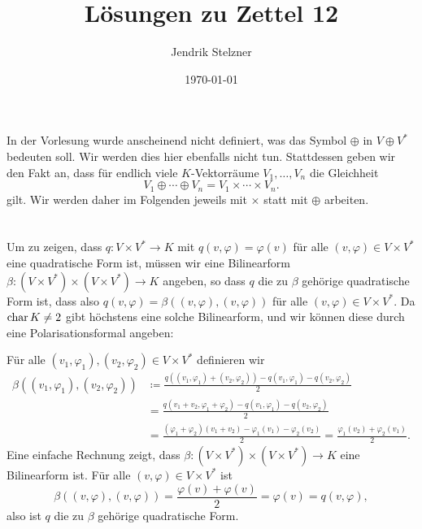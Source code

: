 \documentclass[a4paper,10pt,numbers=noenddot]{scrartcl}
\title{Lösungen zu Zettel 12}
\author{Jendrik Stelzner}
\date{\today}
\begin{document}
\maketitle










\begin{remark}
  In der Vorlesung wurde anscheinend nicht definiert, was das Symbol $\oplus$ in $V \oplus V^*$ bedeuten soll.
  Wir werden dies hier ebenfalls nicht tun.
  Stattdessen geben wir den Fakt an, dass für endlich viele $K$-Vektorräume $V_1, \dotsc, V_n$ die Gleichheit
  \[
      V_1 \oplus \dotsb \oplus V_n
    = V_1 \times \dotsb \times V_n.
  \]
  gilt.
  Wir werden daher im Folgenden jeweils mit $\times$ statt mit $\oplus$ arbeiten.
\end{remark}










\addtocounter{section}{2}










\section{}


Um zu zeigen, dass $q \colon V \times V^* \to K$ mit $q(v, \varphi) = \varphi(v)$ für alle $(v, \varphi) \in V \times V^*$ eine quadratische Form ist, müssen wir eine Bilinearform $\beta \colon (V \times V^*) \times (V \times V^*) \to K$ angeben, so dass $q$ die zu $\beta$ gehörige quadratische Form ist, dass also $q(v,\varphi) = \beta((v, \varphi), (v, \varphi))$ für alle $(v,\varphi) \in V \times V^*$.
Da $\operatorname{char} K \neq 2$ gibt höchstens eine solche Bilinearform, und wir können diese durch eine Polarisationsformal angeben:

Für alle $(v_1, \varphi_1), (v_2, \varphi_2) \in V \times V^*$ definieren wir
\begin{align*}
              \beta((v_1, \varphi_1), (v_2, \varphi_2))
  &\coloneqq  \frac{q((v_1, \varphi_1) + (v_2, \varphi_2)) - q(v_1, \varphi_1) - q(v_2, \varphi_2)}{2}  \\
  &=          \frac{q(v_1 + v_2, \varphi_1 + \varphi_2) - q(v_1, \varphi_1) - q(v_2, \varphi_2)}{2}  \\
  &=          \frac{(\varphi_1 + \varphi_2)(v_1 + v_2) - \varphi_1(v_1) - \varphi_2(v_2)}{2}
   =          \frac{\varphi_1(v_2) + \varphi_2(v_1)}{2}.
\end{align*}
Eine einfache Rechnung zeigt, dass $\beta \colon (V \times V^*) \times (V \times V^*) \to K$ eine Bilinearform ist.
Für alle $(v, \varphi) \in V \times V^*$ ist
\[
    \beta((v, \varphi), (v, \varphi))
  = \frac{\varphi(v) + \varphi(v)}{2}
  = \varphi(v)
  = q(v, \varphi),
\]
also ist $q$ die zu $\beta$ gehörige quadratische Form.
\end{document}

